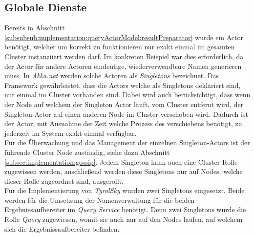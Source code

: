 \subsection{Globale Dienste}
\label{subsec:implementation:singeltons}
Bereits in Abschnitt \ref{subsubsub:implementation:queryActorModel:resultPreparator} wurde ein Actor benötigt, welcher um korrekt zu funktionieren nur exakt einmal im gesamten Cluster instanziiert werden darf. Im konkreten Beispiel war dies erforderlich, da der Actor für andere Actoren eindeutige, wiederverwendbare Namen generieren muss. In \textit{Akka.net} werden solche Actoren als \textit{Singletons} bezeichnet. Das Framework gewährleistet, dass die Actors welche als Singletons deklariert sind, nur einmal im Cluster vorhanden sind. Dabei wird auch berücksichtigt, dass wenn der Node auf welchem der Singleton Actor läuft, vom Cluster entfernt wird, der Singleton-Actor auf einen anderen Node im Cluster verschoben wird. Dadurch ist der Actor, mit Ausnahme der Zeit welche Prozess des verschiebens benötigt, zu jederzeit im System exakt einmal verfügbar. \\
Für die Überwachung und das Management der einzelnen Singleton-Actors ist der führende Cluster Node zuständig, siehe dazu Abschnitt \ref{subsec:implementation:gossip}. Jedem Singleton kann auch eine Cluster Rolle zugewissen werden, anschließend werden diese Singletons nur auf Nodes, welche dieser Rolle zugeordnet sind, ausgerollt. \\
Für die Implementierung von \textit{TyrolSky} wurden zwei Singletons eingesetzt. Beide werden für die Umsetzung der Namenverwaltung für die beiden Ergebnissaufbereiter im \textit{Query Service} benötigt.  Denn zwei Singletons wurde die Rolle \textit{Query} zugewiesen,  womit sie auch nur auf den Nodes laufen, auf welchem sich die Ergebnissaufbereiter befinden.

